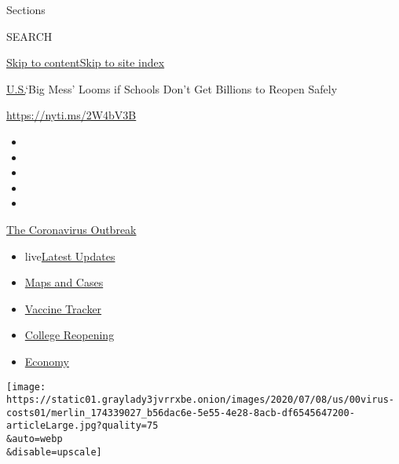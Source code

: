 Sections

SEARCH

\protect\hyperlink{site-content}{Skip to
content}\protect\hyperlink{site-index}{Skip to site index}

\href{/section/us}{U.S.}\textbar{}`Big Mess' Looms if Schools Don't Get
Billions to Reopen Safely

\href{https://nyti.ms/2W4bV3B}{https://nyti.ms/2W4bV3B}

\begin{itemize}
\item
\item
\item
\item
\item
\end{itemize}

\href{https://www.nytimes3xbfgragh.onion/news-event/coronavirus?action=click\&pgtype=Article\&state=default\&region=TOP_BANNER\&context=storylines_menu}{The
Coronavirus Outbreak}

\begin{itemize}
\tightlist
\item
  live\href{https://www.nytimes3xbfgragh.onion/2020/08/04/world/coronavirus-cases.html?action=click\&pgtype=Article\&state=default\&region=TOP_BANNER\&context=storylines_menu}{Latest
  Updates}
\item
  \href{https://www.nytimes3xbfgragh.onion/interactive/2020/us/coronavirus-us-cases.html?action=click\&pgtype=Article\&state=default\&region=TOP_BANNER\&context=storylines_menu}{Maps
  and Cases}
\item
  \href{https://www.nytimes3xbfgragh.onion/interactive/2020/science/coronavirus-vaccine-tracker.html?action=click\&pgtype=Article\&state=default\&region=TOP_BANNER\&context=storylines_menu}{Vaccine
  Tracker}
\item
  \href{https://www.nytimes3xbfgragh.onion/2020/08/02/us/covid-college-reopening.html?action=click\&pgtype=Article\&state=default\&region=TOP_BANNER\&context=storylines_menu}{College
  Reopening}
\item
  \href{https://www.nytimes3xbfgragh.onion/live/2020/08/04/business/stock-market-today-coronavirus?action=click\&pgtype=Article\&state=default\&region=TOP_BANNER\&context=storylines_menu}{Economy}
\end{itemize}

\texttt{[image: https://static01.graylady3jvrrxbe.onion/images/2020/07/08/us/00virus-costs01/merlin\_174339027\_b56dac6e-5e55-4e28-8acb-df6545647200-articleLarge.jpg?quality=75\\\&auto=webp\\\&disable=upscale]}

